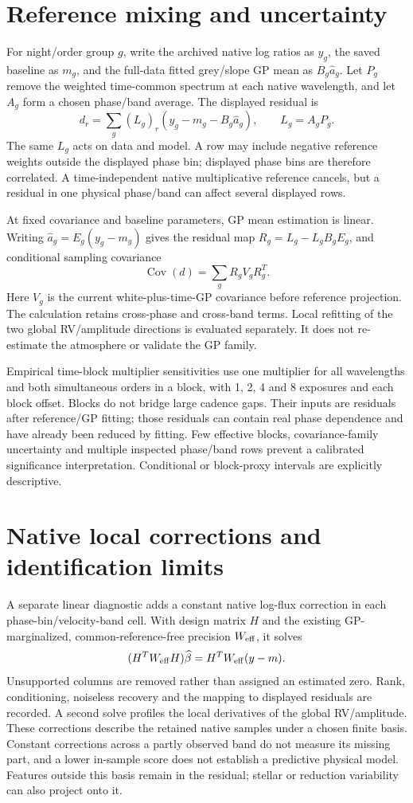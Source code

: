 \documentclass[11pt]{article}
\begin{document}
\section{Reference mixing and uncertainty}
For night/order group $g$, write the archived native log ratios as $y_g$,
the saved baseline as $m_g$, and the full-data fitted grey/slope GP mean as
$B_g\widehat a_g$. Let $P_g$ remove the weighted time-common spectrum at
each native wavelength, and let $A_g$ form a chosen phase/band average.
The displayed residual is
\[
 d_r=\sum_g (L_g)_r(y_g-m_g-B_g\widehat a_g),\qquad L_g=A_gP_g.
\]
The same $L_g$ acts on data and model. A row may include negative reference
weights outside the displayed phase bin; displayed phase bins are therefore
correlated. A time-independent native multiplicative reference cancels,
but a residual in one physical phase/band can affect several displayed rows.

At fixed covariance and baseline parameters, GP mean estimation is linear.
Writing $\widehat a_g=E_g(y_g-m_g)$ gives the residual map
$R_g=L_g-L_gB_gE_g$, and conditional sampling covariance
\[
 \operatorname{Cov}(d)=\sum_g R_g V_g R_g^T.
\]
Here $V_g$ is the current white-plus-time-GP covariance before reference
projection. The calculation retains cross-phase and cross-band terms.
Local refitting of the two global RV/amplitude directions is evaluated
separately. It does not re-estimate the atmosphere or validate the GP family.

Empirical time-block multiplier sensitivities use one multiplier for all
wavelengths and both simultaneous orders in a block, with 1, 2, 4 and 8
exposures and each block offset. Blocks do not bridge large cadence gaps.
Their inputs are residuals after reference/GP fitting; those residuals can
contain real phase dependence and have already been reduced by fitting.
Few effective blocks, covariance-family uncertainty and multiple inspected
phase/band rows prevent a calibrated significance interpretation. Conditional
or block-proxy intervals are explicitly descriptive.

\section{Native local corrections and identification limits}
A separate linear diagnostic adds a constant native log-flux correction in
each phase-bin/velocity-band cell. With design matrix $H$ and the existing
GP-marginalized, common-reference-free precision $W_{\rm eff}$, it solves
\[
 (H^T W_{\rm eff}H)\widehat\beta
 =H^T W_{\rm eff}(y-m).
\]
Unsupported columns are removed rather than assigned an estimated zero.
Rank, conditioning, noiseless recovery and the mapping to displayed residuals
are recorded. A second solve profiles the local derivatives of the global
RV/amplitude. These corrections describe the retained native samples under
a chosen finite basis. Constant corrections across a partly observed band
do not measure its missing part, and a lower in-sample score does not establish
a predictive physical model. Features outside this basis remain in the
residual; stellar or reduction variability can also project onto it.
\end{document}
